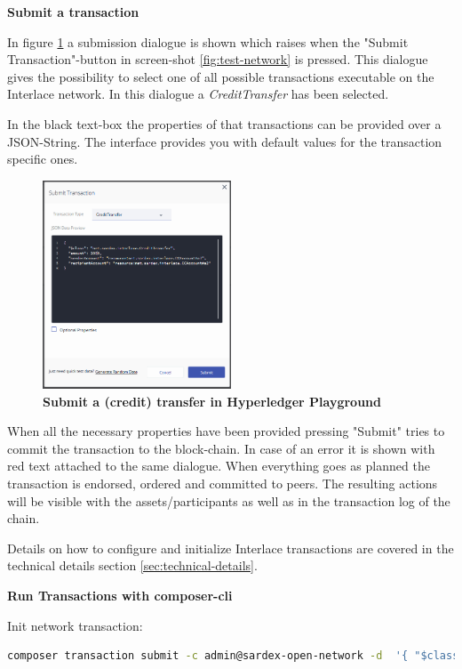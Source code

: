 \textbf{Submit a transaction}

In figure \ref{fig:submit-credit-transfer} a submission dialogue is shown which raises when the "Submit Transaction"-button in screen-shot \ref{fig:test-network} is pressed. This dialogue gives the possibility to select one of all possible transactions executable on the Interlace network. In this dialogue a \textit{CreditTransfer} has been selected.

In the black text-box the properties of that transactions can be provided over a JSON-String. The interface provides you with default values for the transaction specific ones.

\begin{figure}[htbp]
  \centering
  \includegraphics[width=0.5\textwidth]{Figures/submit-credit-transfer}
  \caption{\bf\small Submit a (credit) transfer in Hyperledger Playground}
  \label{fig:submit-credit-transfer}
\end{figure}

When all the necessary properties have been provided pressing "Submit" tries to commit the transaction to the block-chain. In case of an error it is shown with red text attached to the same dialogue. When everything goes as planned the transaction is endorsed, ordered and committed to peers. The resulting actions will be visible with the assets/participants as well as in the transaction log of the chain.

Details on how to configure and initialize Interlace transactions are covered in the technical details section \ref{sec:technical-details}.

\textbf{Run Transactions with composer-cli}

Init network transaction:

\begin{lstlisting}[language=bash]
	composer transaction submit -c admin@sardex-open-network -d  '{ "$class": "net.sardex.interlace.InitBlockchain" }'
\end{lstlisting}


